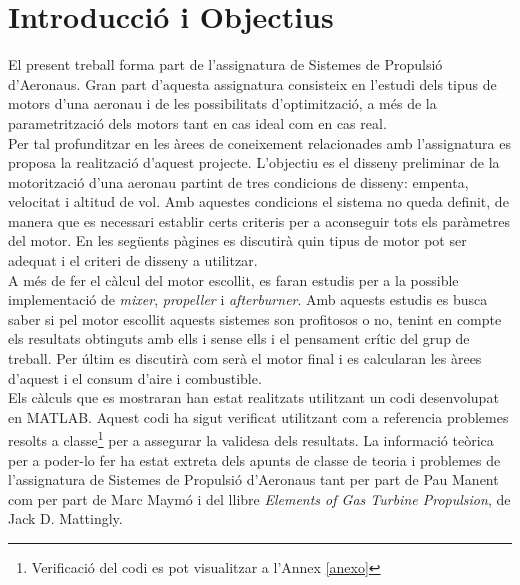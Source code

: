 \section{Introducció i Objectius}
El present treball forma part de l'assignatura de Sistemes de Propulsió d'Aeronaus. Gran part d'aquesta assignatura consisteix en l'estudi dels tipus de motors d'una aeronau i de les possibilitats d'optimització, a més de la parametrització dels motors tant en cas ideal com en cas real.\\
Per tal profunditzar en les àrees de coneixement relacionades amb l'assignatura es proposa la realització d'aquest projecte. L'objectiu es el disseny preliminar de la motorització d'una aeronau partint de tres condicions de disseny: empenta, velocitat i altitud de vol. Amb aquestes condicions el sistema no queda definit, de manera que es necessari establir certs criteris per a aconseguir tots els paràmetres del motor. En les següents pàgines es discutirà quin tipus de motor pot ser adequat i el criteri de disseny a utilitzar.\\
A més de fer el càlcul del motor escollit, es faran estudis per a la possible implementació de \textit{mixer}, \textit{propeller} i \textit{afterburner}. Amb aquests estudis es busca saber si pel motor escollit aquests sistemes son profitosos o no, tenint en compte els resultats obtinguts amb ells i sense ells i el pensament crític del grup de treball. Per últim es discutirà com serà el motor final i es calcularan les àrees d'aquest i el consum d'aire i combustible.\\
Els càlculs que es mostraran han estat realitzats utilitzant un codi desenvolupat en MATLAB. Aquest codi ha sigut verificat utilitzant com a referencia problemes resolts a classe\footnote{Verificació del codi es pot visualitzar a l'Annex \ref{anexo}} per a assegurar la validesa dels resultats. La informació teòrica per a poder-lo fer ha estat extreta dels apunts de classe de teoria i problemes de l'assignatura de Sistemes de Propulsió d'Aeronaus tant per part de Pau Manent com per part de Marc Maymó i del llibre \textit{Elements of Gas Turbine Propulsion}, de Jack D. Mattingly\cite{mattingly}. 